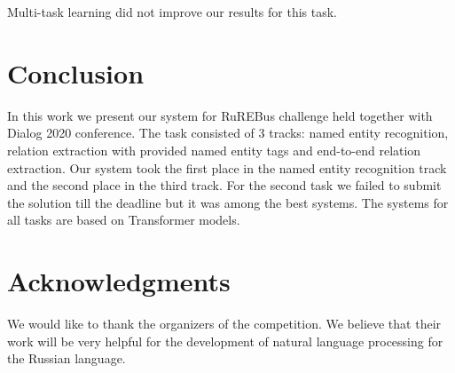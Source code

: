 \documentclass{dialogue}
\begin{document}
Multi-task learning did not improve our results for this task.
\section{Conclusion}
In this work we present our system for RuREBus challenge held together with Dialog 2020 conference. The task consisted of 3 tracks: named entity recognition, relation extraction with provided named entity tags and end-to-end relation extraction. Our system took the first place in the named entity recognition track and the second place in the third track. For the second task we failed to submit the solution till the deadline but it was among the best systems. The systems for all tasks are based on Transformer models.

\section{Acknowledgments}
We would like to thank the organizers of the competition. We believe that their work will be very helpful for the development of natural language processing for the Russian language.

\end{document}
